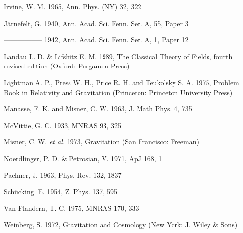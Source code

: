   \noindent Irvine, W. M. 1965, Ann. Phys. (NY) 32, 322
  
  \noindent J\"{a}rnefelt, G. 1940, Ann. Acad. Sci. Fenn. Ser. A, 55, Paper 3
  
  \noindent ----------------- 1942, Ann. Acad. Sci. Fenn. Ser. A, 1, Paper 12
  
  \noindent Landau L. D. \& Lifshitz E. M. 1989, The Classical Theory of Fields,
  fourth revised edition (Oxford: Pergamon Press)

  \noindent Lightman A. P., Press W. H., Price R. H. and Teukolsky S. A.
  1975, Problem Book in Relativity and Gravitation (Princeton: Princeton
  University Press)

  \noindent Manasse, F. K. and Misner, C. W. 1963, J. Math Phys. 4, 735
  
  \noindent McVittie, G. C. 1933, MNRAS 93, 325
  
  \noindent Misner, C. W. {\em et al.} 1973, Gravitation (San Francisco: Freeman)
  
  \noindent Noerdlinger, P. D. \& Petrosian, V. 1971, ApJ 168, 1
  
  \noindent  Pachner, J. 1963, Phys. Rev. 132, 1837
  
  \noindent Sch\"{u}cking, E. 1954, Z. Phys. 137, 595
  
  \noindent Van Flandern, T. C. 1975, MNRAS 170, 333
  
  \noindent Weinberg, S. 1972, Gravitation and Cosmology (New York: J. Wiley \&
  Sons)
  



